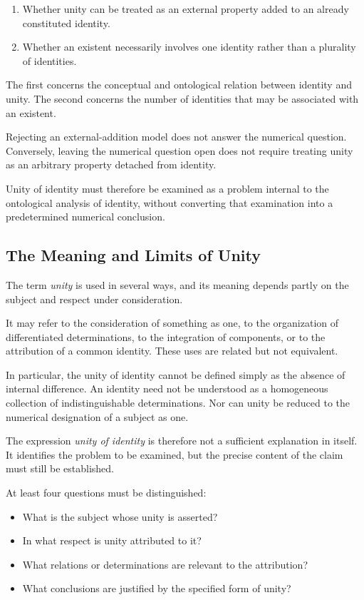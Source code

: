 \begin{enumerate}
    \item Whether unity can be treated as an external
    property added to an already constituted identity.

    \item Whether an existent necessarily involves
    one identity rather than a plurality of identities.
\end{enumerate}

The first concerns the conceptual and ontological
relation between identity and unity. The second
concerns the number of identities that may be
associated with an existent.

Rejecting an external-addition model does not
answer the numerical question. Conversely, leaving
the numerical question open does not require treating
unity as an arbitrary property detached from identity.

Unity of identity must therefore be examined as
a problem internal to the ontological analysis
of identity, without converting that examination
into a predetermined numerical conclusion.

\subsection{The Meaning and Limits of Unity}

The term \emph{unity} is used in several ways,
and its meaning depends partly on the subject
and respect under consideration.

It may refer to the consideration of something
as one, to the organization of differentiated
determinations, to the integration of components,
or to the attribution of a common identity.
These uses are related but not equivalent.

In particular, the unity of identity cannot be
defined simply as the absence of internal difference.
An identity need not be understood as a homogeneous
collection of indistinguishable determinations.
Nor can unity be reduced to the numerical designation
of a subject as one.

The expression \emph{unity of identity} is therefore
not a sufficient explanation in itself. It identifies
the problem to be examined, but the precise content
of the claim must still be established.

At least four questions must be distinguished:

\begin{itemize}
    \item What is the subject whose unity is asserted?
    \item In what respect is unity attributed to it?
    \item What relations or determinations are relevant
    to the attribution?
    \item What conclusions are justified by the
    specified form of unity?
\end{itemize}

